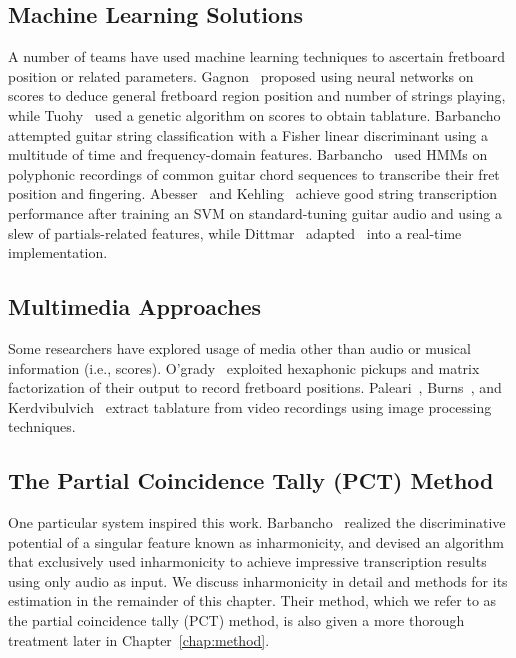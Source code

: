 \documentclass[12pt]{cmuthesis}
\begin{document}
\subsection{Machine Learning Solutions}
A number of teams have used machine learning techniques to ascertain fretboard position or related parameters. Gagnon~\cite{gagnon2003} proposed using neural networks on scores to deduce general fretboard region position and number of strings playing, while Tuohy~\cite{tuohy2006} used a genetic algorithm on scores to obtain tablature. Barbancho~\cite{barbancho2009} attempted guitar string classification with a Fisher linear discriminant using a multitude of time and frequency-domain features. Barbancho~\cite{barbanchoa2012} used HMMs on polyphonic recordings of common guitar chord sequences to transcribe their fret position and fingering. Abesser~\cite{abesser2012} and Kehling~\cite{kehling2014} achieve good string transcription performance after training an SVM on standard-tuning guitar audio and using a slew of partials-related features, while Dittmar~\cite{dittmar2013} adapted~\cite{abesser2012} into a real-time implementation.

\subsection{Multimedia Approaches}
Some researchers have explored usage of media other than audio or musical information (i.e., scores). O'grady~\cite{ogrady2009} exploited hexaphonic pickups and matrix factorization of their output to record fretboard positions. Paleari~\cite{paleari2008}, Burns~\cite{burns2006}, and Kerdvibulvich~\cite{kerd2007} extract tablature from video recordings using image processing techniques.

\subsection{The Partial Coincidence Tally (PCT) Method}
One particular system inspired this work. Barbancho~\cite{barbanchoi2012} realized the discriminative potential of a singular feature known as inharmonicity, and devised an algorithm that exclusively used inharmonicity to achieve impressive transcription results using only audio as input. We discuss inharmonicity in detail and methods for its estimation in the remainder of this chapter. Their method, which we refer to as the partial coincidence tally (PCT) method, is also given a more thorough treatment later in Chapter~\ref{chap:method}.
\end{document}
